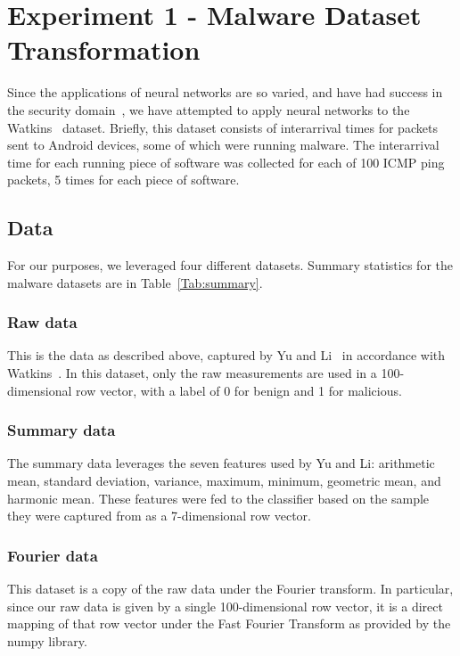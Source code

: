 \chapter{Experiment 1 - Malware Dataset Transformation}
\label{chap:three}

Since the applications of neural networks are so varied, and have had success in the security domain~\cite{raff2018malware}, we have attempted to apply neural networks to the Watkins~\cite{watkins2013using} dataset.
Briefly, this dataset consists of interarrival times for packets sent to Android devices, some of which were running malware.
The interarrival time for each running piece of software was collected for each of 100 ICMP ping packets, 5 times for each piece of software.

\section{Data}
For our purposes, we leveraged four different datasets. 
Summary statistics for the malware datasets are in Table~\ref{Tab:summary}. 

\subsection{Raw data}
This is the data as described above, captured by Yu and Li~\cite{Yu2018Network} in accordance with Watkins~\cite{watkins2013using}.
In this dataset, only the raw measurements are used in a 100-dimensional row vector, with a label of 0 for benign and 1 for malicious.

\subsection{Summary data}
The summary data leverages the seven features used by Yu and Li: arithmetic mean, standard deviation, variance, maximum, minimum, geometric mean, and harmonic mean. 
These features were fed to the classifier based on the sample they were captured from as a 7-dimensional row vector.

\subsection{Fourier data}
This dataset is a copy of the raw data under the Fourier transform.
In particular, since our raw data is given by a single 100-dimensional row vector, it is a direct mapping of that row vector under the Fast Fourier Transform as provided by the numpy library.

